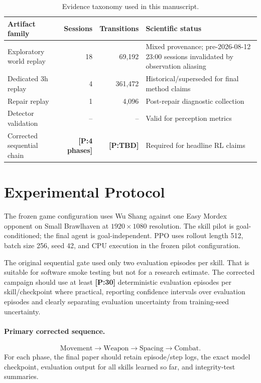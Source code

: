 \documentclass[11pt]{article}
\newcommand{\projected}[1]{\textcolor{Projection}{\textbf{[P:#1]}}}
\begin{document}
\begin{table}[t]
\centering
\caption{Evidence taxonomy used in this manuscript.}
\label{tab:provenance}
\begin{tabularx}{\linewidth}{lrrX}
\toprule
Artifact family & Sessions & Transitions & Scientific status\\
\midrule
Exploratory world replay & 18 & 69,192 & Mixed provenance; pre-2026-08-12 23:00 sessions invalidated by observation aliasing\\
Dedicated 3h replay & 4 & 361,472 & Historical/superseded for final method claims\\
Repair replay & 1 & 4,096 & Post-repair diagnostic collection\\
Detector validation & -- & -- & Valid for perception metrics\\
Corrected sequential chain & \projected{4 phases} & \projected{TBD} & Required for headline RL claims\\
\bottomrule
\end{tabularx}
\end{table}

\section{Experimental Protocol}
The frozen game configuration uses Wu Shang against one Easy Mordex opponent on Small Brawlhaven at $1920\times1080$ resolution. The skill pilot is goal-conditioned; the final agent is goal-independent. PPO uses rollout length 512, batch size 256, seed 42, and CPU execution in the frozen pilot configuration.

The original sequential gate used only two evaluation episodes per skill. That is suitable for software smoke testing but not for a research estimate. The corrected campaign should use at least \projected{30} deterministic evaluation episodes per skill/checkpoint where practical, reporting confidence intervals over evaluation episodes and clearly separating evaluation uncertainty from training-seed uncertainty.

\paragraph{Primary corrected sequence.}
\begin{equation}
\text{Movement}\rightarrow\text{Weapon}\rightarrow\text{Spacing}\rightarrow\text{Combat}.
\end{equation}
For each phase, the final paper should retain episode/step logs, the exact model checkpoint, evaluation output for all skills learned so far, and integrity-test summaries.
\end{document}
